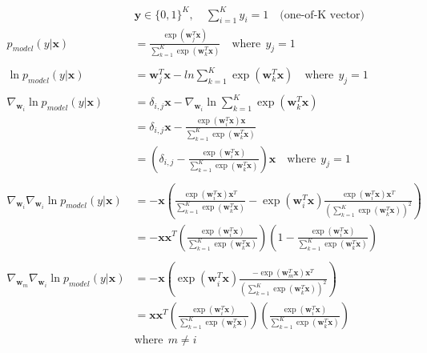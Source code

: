 \documentclass[a4]{article}
\begin{document}
\begin{equation}
\begin{aligned}
&\bm{y} \in \{0,1\}^K,\hspace{1em} \sum_{i=1}^K y_i = 1 
\hspace{1em}\text{(one-of-K vector)}\\
p_{model}(y|\bm{x}) &= \frac{\exp(\bm{w}_j^T\bm{x})}
    {\sum_{k=1}^K\exp(\bm{w}_k^T\bm{x})}\hspace{1em} \text{where}\:\: y_j = 1\\
\\
\ln p_{model}(y|\bm{x}) &= \bm{w}_j^T\bm{x}
- ln \sum_{k=1}^K\exp(\bm{w}_k^T\bm{x})\hspace{1em} \text{where}\:\: y_j = 1\\
\\
\nabla_{\bm{w}_i}\ln p_{model}(y|\bm{x}) 
&= \delta_{i,j}\bm{x} 
   - \nabla_{\bm{w}_i} \ln\sum_{k=1}^K\exp(\bm{w}_k^T\bm{x})\\
&= \delta_{i,j}\bm{x} - \frac{\exp(\bm{w}_i^T\bm{x})\bm{x}}
                 {\sum_{k=1}^K\exp(\bm{w}_k^T\bm{x})}\\
&= \left(\delta_{i,j} - \frac{\exp(\bm{w}_i^T\bm{x})}
     {\sum_{k=1}^K\exp(\bm{w}_k^T\bm{x})}
   \right) \bm{x} \hspace{1em}\text{where}\:\: y_j = 1\\
\\
\nabla_{\bm{w}_i}\nabla_{\bm{w}_i}\ln p_{model}(y|\bm{x}) 
&=
-\bm{x}\left(
\frac{\exp(\bm{w}_i^T\bm{x})\bm{x}^T}
     {\sum_{k=1}^K\exp(\bm{w}_k^T\bm{x})}
- \exp(\bm{w}_i^T\bm{x})\frac{\exp(\bm{w}_i^T\bm{x})\bm{x}^T}
     {\left(\sum_{k=1}^K\exp(\bm{w}_k^T\bm{x})\right)^2}
\right)\\
&=
-\bm{x}\bm{x}^T\left(
\frac{\exp(\bm{w}_i^T\bm{x})}
     {\sum_{k=1}^K\exp(\bm{w}_k^T\bm{x})}
\right)
\left( 1 -
\frac{\exp(\bm{w}_i^T\bm{x})}
     {\sum_{k=1}^K\exp(\bm{w}_k^T\bm{x})} 
\right)\\
\\
\nabla_{\bm{w}_m}\nabla_{\bm{w}_i}\ln p_{model}(y|\bm{x}) 
&=
-\bm{x}\left(
\exp(\bm{w}_i^T\bm{x})\frac{-\exp(\bm{w}_m^T\bm{x})\bm{x}^T}
     {\left(\sum_{k=1}^K\exp(\bm{w}_k^T\bm{x})\right)^2}
\right)\\
&=
\bm{x}\bm{x}^T\left(
\frac{\exp(\bm{w}_i^T\bm{x})}
     {\sum_{k=1}^K\exp(\bm{w}_k^T\bm{x})}
\right)
\left(
\frac{\exp(\bm{w}_i^T\bm{x})}
     {\sum_{k=1}^K\exp(\bm{w}_k^T\bm{x})} 
\right)\\
&\text{where}\:\:m \ne i
\end{aligned}
\end{equation}




{}

\end{document}

